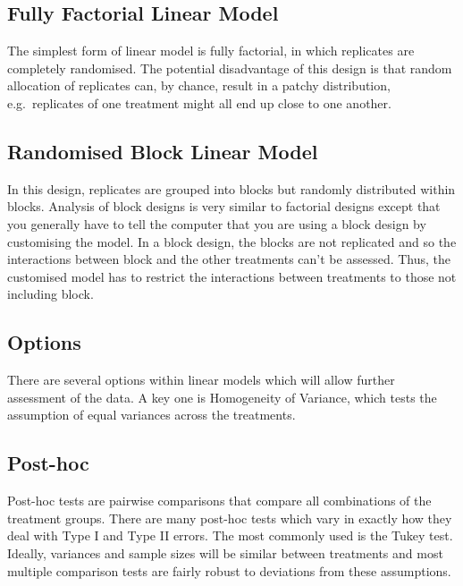 \documentclass[
]{book}
\begin{document}
\subsection{Fully Factorial Linear Model}\label{fully-factorial-linear-model}

The simplest form of linear model is fully factorial, in which replicates are completely randomised. The potential disadvantage of this design is that random allocation of replicates can, by chance, result in a patchy distribution, e.g.~replicates of one treatment might all end up close to one another.

\subsection{Randomised Block Linear Model}\label{randomised-block-linear-model}

In this design, replicates are grouped into blocks but randomly distributed within blocks. Analysis of block designs is very similar to factorial designs except that you generally have to tell the computer that you are using a block design by customising the model. In a block design, the blocks are not replicated and so the interactions between block and the other treatments can't be assessed. Thus, the customised model has to restrict the interactions between treatments to those not including block.

\subsection{Options}\label{options}

There are several options within linear models which will allow further assessment of the data. A key one is Homogeneity of Variance, which tests the assumption of equal variances across the treatments.

\subsection{Post-hoc}\label{post-hoc}

Post-hoc tests are pairwise comparisons that compare all combinations of the treatment groups. There are many post-hoc tests which vary in exactly how they deal with Type I and Type II errors. The most commonly used is the Tukey test. Ideally, variances and sample sizes will be similar between treatments and most multiple comparison tests are fairly robust to deviations from these assumptions.
\end{document}
